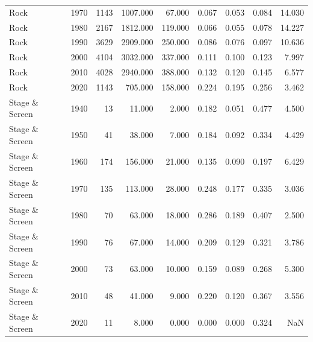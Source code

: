 \begin{table}
{\begin{tabular}{lrrrrrrrr}
                  Rock &           1970 &       1143 & 1007.000 &   67.000 &        0.067 &  0.053 &  0.084 &                 14.030 \\
                  Rock &           1980 &       2167 & 1812.000 &  119.000 &        0.066 &  0.055 &  0.078 &                 14.227 \\
                  Rock &           1990 &       3629 & 2909.000 &  250.000 &        0.086 &  0.076 &  0.097 &                 10.636 \\
                  Rock &           2000 &       4104 & 3032.000 &  337.000 &        0.111 &  0.100 &  0.123 &                  7.997 \\
                  Rock &           2010 &       4028 & 2940.000 &  388.000 &        0.132 &  0.120 &  0.145 &                  6.577 \\
                  Rock &           2020 &       1143 &  705.000 &  158.000 &        0.224 &  0.195 &  0.256 &                  3.462 \\
        Stage \& Screen &           1940 &         13 &   11.000 &    2.000 &        0.182 &  0.051 &  0.477 &                  4.500 \\
        Stage \& Screen &           1950 &         41 &   38.000 &    7.000 &        0.184 &  0.092 &  0.334 &                  4.429 \\
        Stage \& Screen &           1960 &        174 &  156.000 &   21.000 &        0.135 &  0.090 &  0.197 &                  6.429 \\
        Stage \& Screen &           1970 &        135 &  113.000 &   28.000 &        0.248 &  0.177 &  0.335 &                  3.036 \\
        Stage \& Screen &           1980 &         70 &   63.000 &   18.000 &        0.286 &  0.189 &  0.407 &                  2.500 \\
        Stage \& Screen &           1990 &         76 &   67.000 &   14.000 &        0.209 &  0.129 &  0.321 &                  3.786 \\
        Stage \& Screen &           2000 &         73 &   63.000 &   10.000 &        0.159 &  0.089 &  0.268 &                  5.300 \\
        Stage \& Screen &           2010 &         48 &   41.000 &    9.000 &        0.220 &  0.120 &  0.367 &                  3.556 \\
        Stage \& Screen &           2020 &         11 &    8.000 &    0.000 &        0.000 &  0.000 &  0.324 &                    NaN \\

\end{tabular}}
\end{table}
